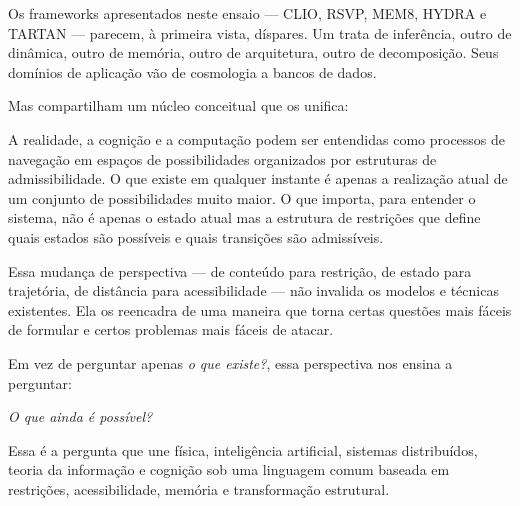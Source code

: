 \documentclass[11pt, a4paper]{article}
\theoremstyle{named}
\begin{document}
Os frameworks apresentados neste ensaio — CLIO, RSVP, MEM\textbar{}8,
HYDRA e TARTAN — parecem, à primeira vista, díspares. Um trata de
inferência, outro de dinâmica, outro de memória, outro de arquitetura,
outro de decomposição. Seus domínios de aplicação vão de cosmologia a
bancos de dados.

Mas compartilham um núcleo conceitual que os unifica:

A realidade, a cognição e a computação podem ser entendidas como
processos de navegação em espaços de possibilidades organizados por
estruturas de admissibilidade. O que existe em qualquer instante é
apenas a realização atual de um conjunto de possibilidades muito maior.
O que importa, para entender o sistema, não é apenas o estado atual
mas a estrutura de restrições que define quais estados são possíveis
e quais transições são admissíveis.

Essa mudança de perspectiva — de conteúdo para restrição, de estado
para trajetória, de distância para acessibilidade — não invalida
os modelos e técnicas existentes. Ela os reencadra de uma maneira que
torna certas questões mais fáceis de formular e certos problemas mais
fáceis de atacar.

Em vez de perguntar apenas \emph{o que existe?}, essa perspectiva
nos ensina a perguntar:

\begin{center}
\textit{O que ainda é possível?}
\end{center}

Essa é a pergunta que une física, inteligência artificial, sistemas
distribuídos, teoria da informação e cognição sob uma linguagem comum
baseada em restrições, acessibilidade, memória e transformação
estrutural.
\end{document}
